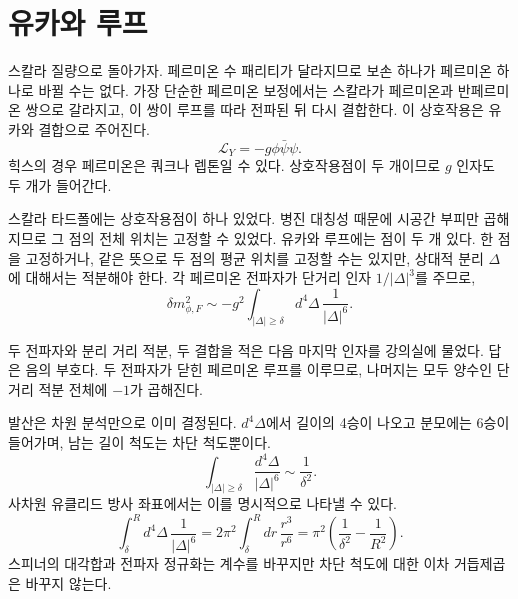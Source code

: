 \section{유카와 루프}

스칼라 질량으로 돌아가자. 페르미온 수 패리티가 달라지므로 보손 하나가 페르미온 하나로 바뀔 수는 없다. 가장 단순한 페르미온 보정에서는 스칼라가 페르미온과 반페르미온 쌍으로 갈라지고, 이 쌍이 루프를 따라 전파된 뒤 다시 결합한다. 이 상호작용은 유카와 결합으로 주어진다.
\begin{equation}
\mathcal L_Y=-g\phi\bar\psi\psi.
\end{equation}
힉스의 경우 페르미온은 쿼크나 렙톤일 수 있다. 상호작용점이 두 개이므로 \(g\) 인자도 두 개가 들어간다.

스칼라 타드폴에는 상호작용점이 하나 있었다. 병진 대칭성 때문에 시공간 부피만 곱해지므로 그 점의 전체 위치는 고정할 수 있었다. 유카와 루프에는 점이 두 개 있다. 한 점을 고정하거나, 같은 뜻으로 두 점의 평균 위치를 고정할 수는 있지만, 상대적 분리 \(\Delta\)에 대해서는 적분해야 한다. 각 페르미온 전파자가 단거리 인자 \(1/|\Delta|^3\)를 주므로,
\begin{equation}
\delta m_{\phi,F}^2
\sim
-g^2\int_{|\Delta|\geq\delta}d^4\Delta\,
\frac{1}{|\Delta|^6}.
\end{equation}

두 전파자와 분리 거리 적분, 두 결합을 적은 다음 마지막 인자를 강의실에 물었다. 답은 음의 부호다. 두 전파자가 닫힌 페르미온 루프를 이루므로, 나머지는 모두 양수인 단거리 적분 전체에 \(-1\)가 곱해진다.

발산은 차원 분석만으로 이미 결정된다. \(d^4\Delta\)에서 길이의 4승이 나오고 분모에는 6승이 들어가며, 남는 길이 척도는 차단 척도뿐이다.
\begin{equation}
\int_{|\Delta|\geq\delta}
\frac{d^4\Delta}{|\Delta|^6}
\sim\frac{1}{\delta^2}.
\end{equation}
사차원 유클리드 방사 좌표에서는 이를 명시적으로 나타낼 수 있다.
\begin{equation}
\int_{\delta}^{R}d^4\Delta\,\frac{1}{|\Delta|^6}
=2\pi^2\int_{\delta}^{R}dr\,\frac{r^3}{r^6}
=\pi^2\left(\frac{1}{\delta^2}-\frac{1}{R^2}\right).
\end{equation}
스피너의 대각합과 전파자 정규화는 계수를 바꾸지만 차단 척도에 대한 이차 거듭제곱은 바꾸지 않는다.

\begin{classroomqa}
\end{classroomqa}

